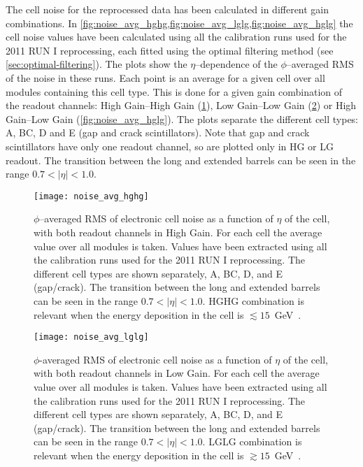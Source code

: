 The cell noise for the reprocessed data has been calculated in different gain
combinations. In \cref{fig:noise_avg_hghg,fig:noise_avg_lglg,fig:noise_avg_hglg}
the cell noise values have been calculated using all the calibration runs used
for the 2011 RUN I reprocessing, each fitted using the optimal filtering method
(see \cref{sec:optimal-filtering}). The plots show the $\eta$--dependence of the
$\phi$--averaged RMS of the noise in these runs. Each point is an average for a
given cell over all modules containing this cell type. This is done for a given
gain combination of the readout channels: High Gain--High Gain
(\cref{fig:noise_avg_hghg}), Low Gain--Low Gain (\cref{fig:noise_avg_lglg}) or
High Gain--Low Gain (\cref{fig:noise_avg_hglg}). The plots separate the
different cell types: A, BC, D and E (gap and crack scintillators). Note that
gap and crack scintillators have only one readout channel, so are plotted only
in HG or LG readout. The transition between the long and extended barrels can be
seen in the range $0.7 < |\eta| < 1.0$.


\begin{figure}[!h]
  \centering
    \texttt{[image: noise\_avg\_hghg]}
    \caption{$\phi$--averaged RMS of electronic cell noise as a function of
      $\eta$ of the cell, with both readout channels in High Gain. For each cell
      the average value over all modules is taken. Values have been extracted
      using all the calibration runs used for the 2011 RUN I reprocessing. The
      different cell types are shown separately, A, BC, D, and E
      (gap/crack). The transition between the long and extended barrels can be
      seen in the range $0.7 < |\eta| < 1.0$. HGHG combination is relevant when
      the energy deposition in the cell is
      $\lesssim 15$~GeV~\cite{MyTileCalPlots}.}
    \label{fig:noise_avg_hghg}
\end{figure}

\begin{figure}[!h]
  \centering
    \texttt{[image: noise\_avg\_lglg]}
    \caption{$\phi$-averaged RMS of electronic cell noise as a function of
      $\eta$ of the cell, with both readout channels in Low Gain. For each cell
      the average value over all modules is taken. Values have been extracted
      using all the calibration runs used for the 2011 RUN I reprocessing. The
      different cell types are shown separately, A, BC, D, and E
      (gap/crack). The transition between the long and extended barrels can be
      seen in the range $0.7 < |\eta| < 1.0$. LGLG combination is relevant when
      the energy deposition in the cell is
      $\gtrsim 15$~GeV~\cite{MyTileCalPlots}.}
    \label{fig:noise_avg_lglg}
\end{figure}

